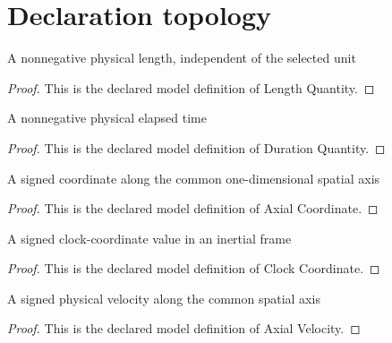 \section{Declaration topology}
\begin{definition}
  \label{def:physics:phyx-mini-0529:phyxminiproblems-problemphyxmini0529-lengthquantity}
  A nonnegative physical length, independent of the selected unit
\end{definition}
\begin{proof}
  This is the declared model definition of Length Quantity.
\end{proof}
\begin{definition}
  \label{def:physics:phyx-mini-0529:phyxminiproblems-problemphyxmini0529-durationquantity}
  A nonnegative physical elapsed time
\end{definition}
\begin{proof}
  This is the declared model definition of Duration Quantity.
\end{proof}
\begin{definition}
  \label{def:physics:phyx-mini-0529:phyxminiproblems-problemphyxmini0529-axialcoordinate}
  A signed coordinate along the common one-dimensional spatial axis
\end{definition}
\begin{proof}
  This is the declared model definition of Axial Coordinate.
\end{proof}
\begin{definition}
  \label{def:physics:phyx-mini-0529:phyxminiproblems-problemphyxmini0529-clockcoordinate}
  A signed clock-coordinate value in an inertial frame
\end{definition}
\begin{proof}
  This is the declared model definition of Clock Coordinate.
\end{proof}
\begin{definition}
  \label{def:physics:phyx-mini-0529:phyxminiproblems-problemphyxmini0529-axialvelocity}
  A signed physical velocity along the common spatial axis
\end{definition}
\begin{proof}
  This is the declared model definition of Axial Velocity.
\end{proof}
